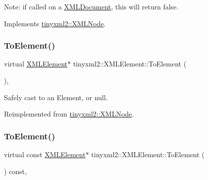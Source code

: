 Note\+: if called on a \hyperlink{classtinyxml2_1_1_x_m_l_document}{X\+M\+L\+Document}, this will return false. 

Implements \hyperlink{classtinyxml2_1_1_x_m_l_node_a7ce18b751c3ea09eac292dca264f9226}{tinyxml2\+::\+X\+M\+L\+Node}.

\mbox{\label{classtinyxml2_1_1_x_m_l_element_ad9ff5c2dbc15df36cf664ce1b0ea0a5d}} 
\subsubsection{\texorpdfstring{To\+Element()}{ToElement()}\hspace{0.1cm}{\footnotesize\ttfamily [1/2]}}
{\footnotesize\ttfamily virtual \hyperlink{classtinyxml2_1_1_x_m_l_element}{X\+M\+L\+Element}$\ast$ tinyxml2\+::\+X\+M\+L\+Element\+::\+To\+Element (\begin{DoxyParamCaption}{ }\end{DoxyParamCaption})\hspace{0.3cm}{\ttfamily [inline]}, {\ttfamily [virtual]}}



Safely cast to an Element, or null. 



Reimplemented from \hyperlink{classtinyxml2_1_1_x_m_l_node_aab516e699567f75cc9ab2ef2eee501e8}{tinyxml2\+::\+X\+M\+L\+Node}.

\mbox{\label{classtinyxml2_1_1_x_m_l_element_afeb353047ab8532191709dcaef07337e}} 
\subsubsection{\texorpdfstring{To\+Element()}{ToElement()}\hspace{0.1cm}{\footnotesize\ttfamily [2/2]}}
{\footnotesize\ttfamily virtual const \hyperlink{classtinyxml2_1_1_x_m_l_element}{X\+M\+L\+Element}$\ast$ tinyxml2\+::\+X\+M\+L\+Element\+::\+To\+Element (\begin{DoxyParamCaption}{ }\end{DoxyParamCaption}) const\hspace{0.3cm}{\ttfamily [inline]}, {\ttfamily [virtual]}}



